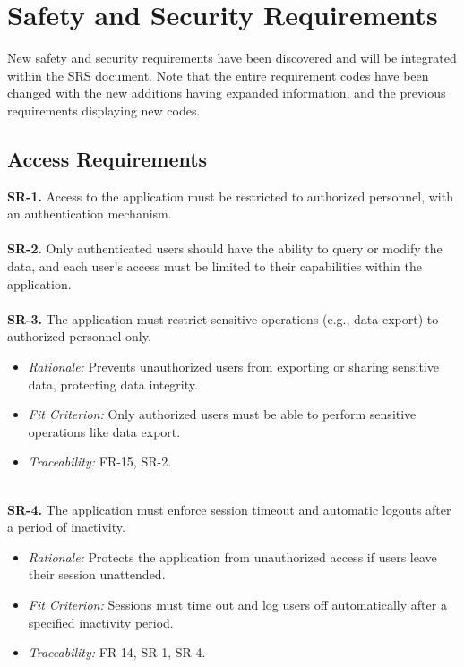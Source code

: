 \documentclass{article}
\begin{document}
\restoregeometry

\section{Safety and Security Requirements}
New safety and security requirements have been discovered and will be integrated
within the SRS document. Note that the entire requirement codes have been
changed with the new additions having expanded information, and the previous
requirements displaying new codes.

\subsection{Access Requirements}
\textbf{SR-1.} Access to the application must be restricted to authorized
  personnel, with an authentication mechanism. \ \\
\ \\
\textbf{SR-2.} Only authenticated users should have the ability to query or
  modify the data, and each user’s access must be limited to their capabilities
  within the application. \ \\
  \ \\
\textbf{SR-3.} The application must restrict sensitive operations (e.g., data export)
  to authorized personnel only.
    \begin{itemize}
      \item \textit{Rationale:} Prevents unauthorized users from exporting or
      sharing sensitive data, protecting data integrity.
      \item \textit{Fit Criterion:} Only authorized users must be able to
      perform sensitive operations like data export.
      \item \textit{Traceability:} FR-15, SR-2.
    \end{itemize}
\ \\
\textbf{SR-4.} The application must enforce session timeout and automatic logouts
after a period of inactivity.
  \begin{itemize}
    \item \textit{Rationale:} Protects the application from unauthorized access if
    users leave their session unattended.
    \item \textit{Fit Criterion:} Sessions must time out and log users off
    automatically after a specified inactivity period.
    \item \textit{Traceability:} FR-14, SR-1, SR-4.
  \end{itemize}
\end{document}
